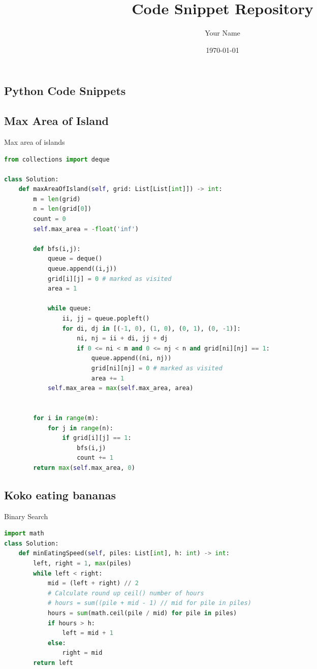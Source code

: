 \documentclass[a4paper,12pt]{article}
\title{Code Snippet Repository}
\author{Your Name}
\date{\today}
\begin{document}
\maketitle

\begin{multicols}{2}

\section{Python Code Snippets}

\subsection{Max Area of Island}
\begin{mycode}[label={lst:max-area-of-island}]{Max area of islands}
\begin{lstlisting}[language=Python]
from collections import deque

class Solution:
    def maxAreaOfIsland(self, grid: List[List[int]]) -> int:
        m = len(grid)
        n = len(grid[0])
        count = 0
        self.max_area = -float('inf')

        def bfs(i,j):
            queue = deque()
            queue.append((i,j))
            grid[i][j] = 0 # marked as visited
            area = 1

            while queue:
                ii, jj = queue.popleft()
                for di, dj in [(-1, 0), (1, 0), (0, 1), (0, -1)]:
                    ni, nj = ii + di, jj + dj
                    if 0 <= ni < m and 0 <= nj < n and grid[ni][nj] == 1:
                        queue.append((ni, nj))
                        grid[ni][nj] = 0 # marked as visited
                        area += 1
            self.max_area = max(self.max_area, area)

        
        for i in range(m):
            for j in range(n):
                if grid[i][j] == 1:
                    bfs(i,j)
                    count += 1
        return max(self.max_area, 0)
\end{lstlisting}
\end{mycode}

\subsection{Koko eating bananas}
\begin{mycode}[label={lst:koko-eating-bananas}]{Binary Search}
\begin{lstlisting}[language=Python]
import math
class Solution:
    def minEatingSpeed(self, piles: List[int], h: int) -> int:
        left, right = 1, max(piles)
        while left < right:
            mid = (left + right) // 2
            # Calculate round up ceil() number of hours
            # hours = sum((pile + mid - 1) // mid for pile in piles)
            hours = sum(math.ceil(pile / mid) for pile in piles)
            if hours > h:
                left = mid + 1
            else:
                right = mid
        return left
\end{lstlisting}
\end{mycode}


\end{multicols}
\end{document}
